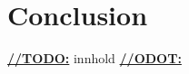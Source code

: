 \chapter{Conclusion}

\underline{\textbf{\LARGE //TODO:}}
innhold
\underline{\textbf{\LARGE //ODOT:}}